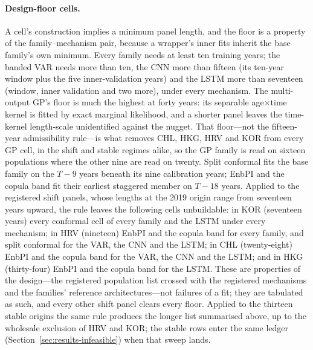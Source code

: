 \begin{table}[htbp]\centering
\caption{Admissible model-family $\times$ uncertainty-mechanism grid, transcribed
from the pre-registration.}
\label{tab:grid}
\end{table}

\paragraph{Design-floor cells.} A cell's construction implies a minimum
panel length, and the floor is a property of the family--mechanism pair,
because a wrapper's inner fits inherit the base family's own minimum.
Every family needs at least ten training years; the banded VAR needs more
than ten, the CNN more than fifteen (its ten-year window plus the five
inner-validation years) and the LSTM more than seventeen (window, inner
validation and two more), under every mechanism. The multi-output GP's
floor is much the highest at forty years: its separable
age$\times$time kernel is fitted by exact marginal likelihood, and a
shorter panel leaves the time-kernel length-scale unidentified against the
nugget. That floor---not the fifteen-year admissibility rule---is what
removes CHL, HKG, HRV and KOR from every GP cell, in the shift and stable
regimes alike, so the GP family is read on sixteen populations where the
other nine are read on twenty. Split conformal fits the
base family on the $T-9$ years beneath its nine calibration years; EnbPI
and the copula band fit their earliest staggered member on $T-18$ years.
Applied to the registered shift panels, whose lengths at the 2019 origin
range from seventeen years upward, the rule leaves the following cells
unbuildable: in KOR (seventeen years) every conformal cell of every family
and the LSTM under every mechanism; in HRV (nineteen) EnbPI and the copula
band for every family, and split conformal for the VAR, the CNN and the
LSTM; in CHL (twenty-eight) EnbPI and the copula band for the VAR, the CNN
and the LSTM; and in HKG (thirty-four) EnbPI and the copula band for the
LSTM. These are properties of the design---the registered population list
crossed with the registered mechanisms and the families' reference
architectures---not failures of a fit; they are tabulated as such, and
every other shift panel clears every floor. Applied to the thirteen stable
origins the same rule produces the longer list summarised above, up to the
wholesale exclusion of HRV and KOR; the stable rows enter the same ledger
(Section~\ref{sec:results-infeasible}) when that sweep lands.

